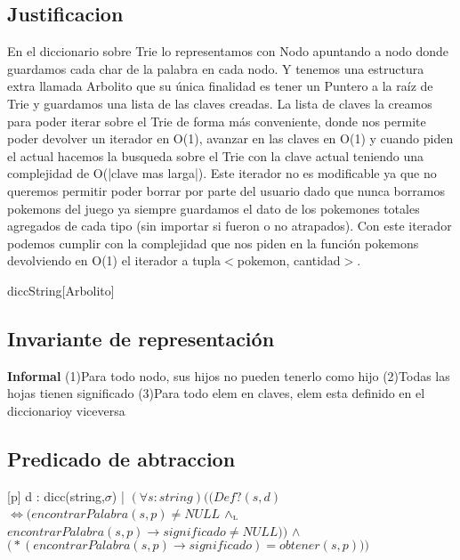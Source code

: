 \begin{Representacion}

\subsection{Justificacion}
En el diccionario sobre Trie lo representamos con Nodo apuntando a nodo donde guardamos cada char de la palabra en cada nodo. Y tenemos una estructura extra llamada Arbolito que su única finalidad es tener un Puntero a la ra\'iz de Trie y guardamos una lista de las claves creadas. La lista de claves la creamos para poder iterar sobre el Trie de forma m\'as conveniente, donde nos permite poder devolver un iterador en O(1), avanzar en las claves en O(1) y cuando piden el actual hacemos la busqueda sobre el Trie con la clave actual teniendo una complejidad de O(|clave mas larga|).
Este iterador no es modificable ya que no queremos permitir poder borrar por parte del usuario dado que nunca borramos pokemons del juego ya siempre guardamos el dato de los pokemones totales agregados de cada tipo (sin importar si fueron o no atrapados).
Con este iterador podemos cumplir con la complejidad que nos piden en la funci\'on pokemons devolviendo en O(1) el iterador a tupla$<$pokemon, cantidad$>$.
	\begin{Estructura}{diccString}[Arbolito]
		\begin{Tupla}[Arbolito]
		\end{Tupla}
		\begin{Tupla}[nodo]
		\end{Tupla}
	\end{Estructura}
\subsection{Invariante de representación}

\textbf{Informal}
(1)Para todo nodo, sus hijos no pueden tenerlo como hijo
(2)Todas las hojas tienen significado
(3)Para todo elem en claves, elem esta definido en el diccionarioy viceversa

\subsection{Predicado de abtraccion}

[p]{ d : dicc(string,$\sigma$) | $(\forall s:string)\Big( \big(Def?(s,d)$ $\Longleftrightarrow (encontrarPalabra(s,p) \neq NULL$ $\land_{\mathrm{\scriptscriptstyle{L}}}$ $encontrarPalabra(s,p)\to significado \neq NULL)\big)$ $\land$ $\big(*(encontrarPalabra(s,p)\to significado) = obtener(s,p)\big)\Big)$}



\end{Representacion}
